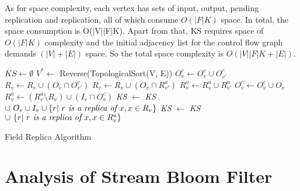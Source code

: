 As for space complexity, each vertex has sets of input, output, pending replication and replication, all of which consume $O(|F|K)$ space. In total, the space consumption is O(|V||F|K). Apart from that, KS requires space of $O(|F|K)$ complexity and the initial adjacency list for the control flow graph demands $(|V|+|E|)$ space. So the total space complexity is $O(|V||F|K+|E|)$.

\begin{algorithm}[!t]
\LinesNumbered
{}
$KS \leftarrow \emptyset$ \;
$ V^{*} \leftarrow $ Reverse(TopologicalSort(V, E)) \;
 {
     {
    	$O^c_v \leftarrow O^c_v \cup O^c_{v'}$ \;
    	$ R_v \leftarrow R_v \cup ( O_v \cap O^c_{v'} ) $ \;
    	$ R_v \leftarrow R_v \cup ( O_v \cap R_{v'}^a )$ \;
        $ R^a_v \leftarrow R^a_v \cup R^a_{v'}  $ \;
    }    
	$O^c_v \leftarrow O^c_v \cup O_v $ \;
    $R^a_v \leftarrow (R^a_v \setminus R_v) \cup (I_v \cap O^c_v) $ \;
    \textit{KS} $\leftarrow$ \textit{KS} $ \cup \ O_v \cup I_v \cup \{r|\ \text{\textit{$r$ is a replica of $x$}}, x \in R_v\} $\;
     {
    	\textit{KS} $\leftarrow$ \textit{KS} $ \cup \ \{r|\ \text{\textit{$r$ is a replica of $x$}}, x \in R^a_v\}  $\;
    }
}
\;
\caption{Field Replica Algorithm}
\label{alg:field-replica}
\end{algorithm}




\section{Analysis of Stream Bloom Filter}

\newcommand{\Y}{{\color{red}$\checkmark$}}
\newcommand{\N}{{\color{green}\textbf{$\times$}}}

